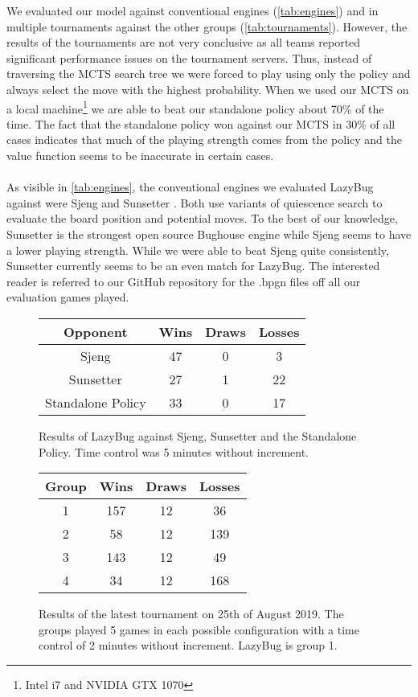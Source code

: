 We evaluated our model against conventional engines (\autoref{tab:engines}) and in multiple tournaments against the other groups (\autoref{tab:tournaments}).
However, the results of the tournaments are not very conclusive as all teams reported significant performance issues on the tournament servers.
Thus, instead of traversing the MCTS search tree we were forced to play using only the policy and always select the move with the highest probability.
When we used our MCTS on a local machine\footnote{Intel i7 and NVIDIA GTX 1070} we are able to beat our standalone policy about 70\% of the time.
The fact that the standalone policy won against our MCTS in 30\% of all cases indicates that much of the playing strength comes from the policy and the value function seems to be inaccurate in certain cases.
\\\\
As visible in \autoref{tab:engines}, the conventional engines we evaluated LazyBug against were Sjeng \cite{sjeng} and Sunsetter \cite{sunsetter}.
Both use variants of quiescence search to evaluate the board position and potential moves.
To the best of our knowledge, Sunsetter is the strongest open source Bughouse engine while Sjeng seems to have a lower playing strength.
While we were able to beat Sjeng quite consistently, Sunsetter currently seems to be an even match for LazyBug.
The interested reader is referred to our GitHub repository \cite{code} for the .bpgn files off all our evaluation games played.

\begin{figure}
	\begin{tabular}{ |c|c|c|c| }
		\hline
		Opponent & Wins & Draws & Losses \\
		\hline \hline
		\hline Sjeng & 47 & 0 & 3 \\
		\hline Sunsetter & 27 & 1 & 22 \\
		\hline Standalone Policy & 33 & 0 & 17  \\
		\hline
	\end{tabular}
	\label{tab:engines}
	\caption{
	Results of LazyBug against Sjeng, Sunsetter and the Standalone Policy.
	Time control was 5 minutes without increment.
	}
\end{figure}

\begin{figure}
	\begin{tabular}{ |c|c|c|c| }
		\hline
		Group & Wins & Draws & Losses \\
		\hline \hline
		\hline 1 & 157 	& 12 	& 36 \\
		\hline 2 & 58 	& 12 	& 139 \\
		\hline 3 & 143 	& 12 	& 49 \\
		\hline 4 & 34 	& 12 	& 168  \\
		\hline
	\end{tabular}
	\label{tab:tournaments}
	\caption{
		Results of the latest tournament on 25th of August 2019.
		The groups played 5 games in each possible configuration with a time control of 2 minutes without increment.
		LazyBug is group 1.
	}
\end{figure}


